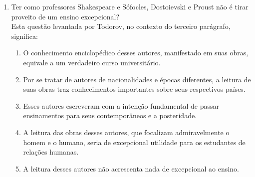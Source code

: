 \documentclass[10pt,a4paper]{article}
\begin{document}
\begin{multicols}{2}
\begin{enumerate}
	II. A an\'alise das obras feita na escola deve levar o estudante a ter acesso ao sentido dessas obras.\\
	III. O objetivo do ensino da literatura na escola n\~ao \'e formar te\'oricos da literatura.\\
	IV. De nada adianta a leitura das obras liter\'arias sem a pr\'evia fundamenta\c{c}\~ao das teorias liter\'arias.\\
	Das quatro opini\~oes, as que se enquadram na argumenta\c{c}\~ao manifestada por Todorov em seu texto est\~ao contidas apenas em:
		\begin{enumerate}
		\item I e II
		\item I e III
		\item II e III
		\item I, II e  III
		\item II, III e  IV
		\end{enumerate}

	\item Ter como professores Shakespeare e S\'ofocles, Dostoievski e Proust n\~ao \'e tirar proveito de um ensino excepcional? \\
	Esta quest\~ao levantada por Todorov, no contexto do terceiro par\'agrafo, significa:
		\begin{enumerate}
		\item O conhecimento enciclop\'edico desses autores, manifestado em suas obras, equivale a um verdadeiro curso universit\'ario.
		\item Por se tratar de autores de nacionalidades e \'epocas diferentes, a leitura de suas obras traz conhecimentos importantes sobre seus respectivos pa\'ises.
		\item Esses autores escreveram com a inten\c{c}\~ao fundamental de passar ensinamentos para seus contemporâneos e a posteridade.
		\item A leitura das obras desses autores, que focalizam admiravelmente o homem e o humano, seria de excepcional utilidade para os estudantes de rela\c{c}\~oes humanas.
		\item A leitura desses autores n\~ao acrescenta nada de excepcional ao ensino.
		\end{enumerate}


\end{enumerate}
\end{multicols}
\end{document}
